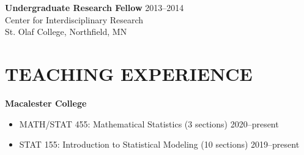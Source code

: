 \documentclass[margin]{res}
\begin{document}
\begin{resume}
\textbf{Undergraduate Research Fellow} \hfill 2013--2014 \\
Center for Interdisciplinary Research \\
St. Olaf College, Northfield, MN \\


\section{TEACHING EXPERIENCE}

\textbf{Macalester College}
\begin{itemize}
\item MATH/STAT 455: Mathematical Statistics (3 sections) \hfill 2020--present 
\item STAT 155: Introduction to Statistical Modeling (10 sections)  \hfill 2019--present \\
\end{itemize}



\end{resume}
\end{document}
